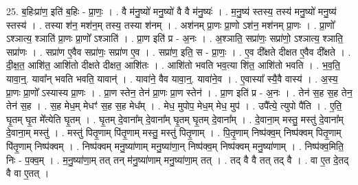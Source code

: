 \documentclass[17pt]{extarticle}
\begin{document}
25. ब॒हिःप्रा॑ण॒ इति॑ ब॒हिः - प्रा॒णः॒ । . वै म॑नु॒ष्यो॑ मनु॒ष्यो॑ वै वै म॑नु॒ष्यः॑ । . म॒नु॒ष्य॑ स्तस्य॒ तस्य॑ मनु॒ष्यो॑ मनु॒ष्य॑ स्तस्य॑ । . तस्या श॑न॒ मश॑न॒म् तस्य॒ तस्या श॑नम् । . अश॑नम् प्रा॒णः प्रा॒णो ऽश॑न॒ मश॑नम् प्रा॒णः । . प्रा॒णो᳚ ऽश्ञात्य॒ श्ञाति॑ प्रा॒णः प्रा॒णो᳚ ऽश्ञाति॑ । . प्रा॒ण इति॑ प्र - अ॒नः । . अ॒श्ञाति॒ सप्रा॑णः॒ सप्रा॑णो॒ ऽश्ञात्य॒ श्ञाति॒ सप्रा॑णः । . सप्रा॑ण ए॒वैव सप्रा॑णः॒ सप्रा॑ण ए॒व । . सप्रा॑ण॒ इति॒ स - प्रा॒णः॒ । . ए॒व दी᳚क्षते दीक्षत ए॒वैव दी᳚क्षते । . दी॒क्ष॒त॒ आशि॑त॒ आशि॑तो दीक्षते दीक्षत॒ आशि॑तः । . आशि॑तो भवति भव॒त्या शि॑त॒ आशि॑तो भवति । . भ॒व॒ति॒ यावा॒न्॒. यावा᳚न् भवति भवति॒ यावान्॑ । . यावा॑ने॒ वैव यावा॒न्॒. यावा॑ने॒व । . ए॒वास्या᳚ स्यै॒वै वास्य॑ । . अ॒स्य॒ प्रा॒णः प्रा॒णो᳚ ऽस्यास्य प्रा॒णः । . प्रा॒ण स्तेन॒ तेन॑ प्रा॒णः प्रा॒ण स्तेन॑ । . प्रा॒ण इति॑ प्र - अ॒नः । . तेन॑ स॒ह स॒ह तेन॒ तेन॑ स॒ह । . स॒ह मेध॒म् मेधꣳ॑ स॒ह स॒ह मेध᳚म् । . मेध॒ मुपोप॒ मेध॒म् मेध॒ मुप॑ । . उपै᳚त्ये॒ त्युपो पै॑ति । . ए॒ति॒ घृ॒तम् घृ॒त मे᳚त्येति घृ॒तम् । . घृ॒तम् दे॒वाना᳚म् दे॒वाना᳚म् घृ॒तम् घृ॒तम् दे॒वाना᳚म् । . दे॒वाना॒म् मस्तु॒ मस्तु॑ दे॒वाना᳚म् दे॒वाना॒म् मस्तु॑ । . मस्तु॑ पितृ॒णाम् पि॑तृ॒णाम् मस्तु॒ मस्तु॑ पितृ॒णाम् । . पि॒तृ॒णाम् निष्प॑क्व॒म् निष्प॑क्वम् पितृ॒णाम् पि॑तृ॒णाम् निष्प॑क्वम् । . निष्प॑क्वम् मनु॒ष्या॑णाम् मनु॒ष्या॑णा॒न् निष्प॑क्व॒म् निष्प॑क्वम् मनु॒ष्या॑णाम् । . निष्प॑क्व॒मिति॒ निः - प॒क्व॒म् । . म॒नु॒ष्या॑णा॒म् तत् तन् म॑नु॒ष्या॑णाम् मनु॒ष्या॑णा॒म् तत् । . तद् वै वै तत् तद् वै । . वा ए॒त दे॒तद् वै वा ए॒तत् । \newline
\end{document}
